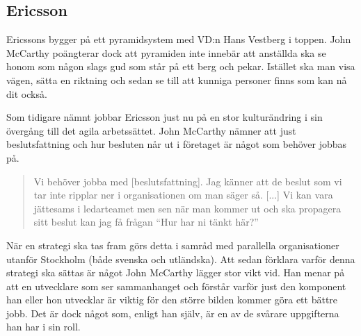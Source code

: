 \subsection{Ericsson}
Ericssons bygger på ett pyramidsystem med VD:n Hans Vestberg i toppen. John McCarthy poängterar dock att pyramiden inte innebär att anställda ska se honom som någon slags gud som står på ett berg och pekar. Istället ska man visa vägen, sätta en riktning och sedan se till att kunniga personer finns som kan nå dit också.

Som tidigare nämnt jobbar Ericsson just nu på en stor kulturändring i sin övergång till det agila arbetssättet. John McCarthy nämner att just beslutsfattning och hur besluten når ut i företaget är något som behöver jobbas på.

\begin{quote}
Vi behöver jobba med [beslutsfattning]. Jag känner att de beslut som vi tar inte ripplar ner i organisationen om man säger så. [...] Vi kan vara jättesams i ledarteamet men sen när man kommer ut och ska propagera sitt beslut kan jag få frågan ``Hur har ni tänkt här?''
\end{quote}

När en strategi ska tas fram görs detta i samråd med parallella organisationer utanför Stockholm (både svenska och utländska). Att sedan förklara varför denna strategi ska sättas är något John McCarthy lägger stor vikt vid. Han menar på att en utvecklare som ser sammanhanget och förstår varför just den komponent han eller hon utvecklar är viktig för den större bilden kommer göra ett bättre jobb. Det är dock något som, enligt han själv, är en av de svårare uppgifterna han har i sin roll.